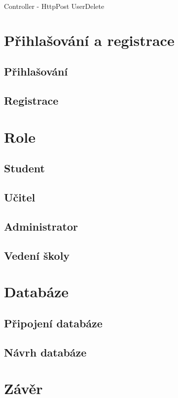 \documentclass[a4paper, 12pt]{report}
\begin{document}
	\begin{listing}[H]
	\inputminted{csharp}{SourceCode/Controllers/Delete_Post.cs}
	\caption{Controller - HttpPost UserDelete}
	\label{Delete_Post}
	\end{listing}
	
	
	\chapter{Přihlašování a registrace}
	\section{Přihlašování}
	\section{Registrace}

	\chapter{Role} \label{Role}
	\section{Student}
	\section{Učitel}
	\section{Administrator}
	\section{Vedení školy}

	\chapter{Databáze} \label{Databaze}
	\section{Připojení databáze}
	\section{Návrh databáze}
	\chapter{Závěr}

	\seznamTabulek
	
	\seznamObrazku

	\renewcommand\listoflistingscaption{Seznam zdrojových kódů}
	\listoflistings
	

	
	

\end{document}
